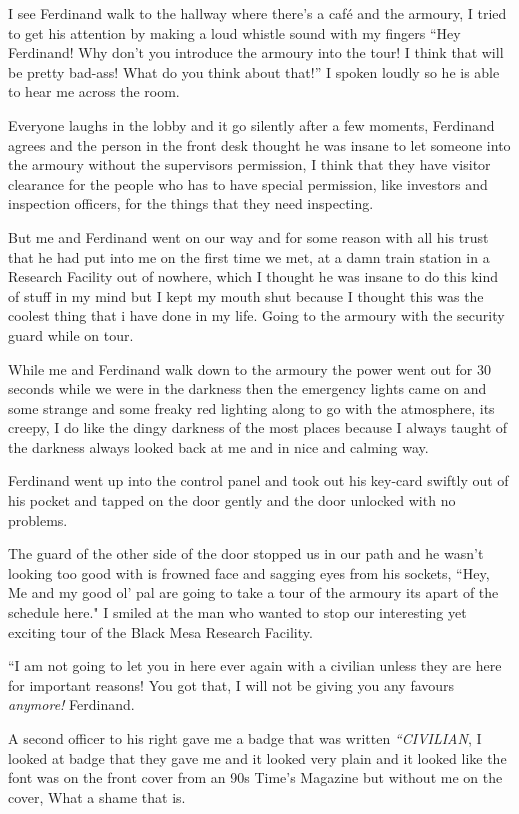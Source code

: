 \documentclass[14pt,letterpaper]{book}
\begin{document}
I see Ferdinand walk to the hallway where there's a café and the armoury, I tried to get his attention by making a loud whistle sound with my fingers ``Hey Ferdinand! Why don't you introduce the armoury into the tour! I think that will be pretty bad-ass! What do you think about that!'' I spoken loudly so he is able to hear me across the room.
 
Everyone laughs in the lobby and it go silently after a few moments, Ferdinand agrees and the person in the front desk thought he was insane to let someone into the armoury without the supervisors permission, I think that they have visitor clearance for the people who has to have special permission, like investors and inspection officers, for the things that they need inspecting.

But me and Ferdinand went on our way and for some reason with all his trust that he had put into me on the first time we met, at a damn train station in a Research Facility out of nowhere, which I thought he was insane to do this kind of stuff in my mind but I kept my mouth shut because I thought this was the coolest thing that i have done in my life. Going to the armoury with the security guard while on tour.

While me and Ferdinand walk down to the armoury the power went out for 30 seconds while we were in the darkness then the emergency lights came on and some strange and some freaky red lighting along to go with the atmosphere, its creepy, I do like the dingy darkness of the most places because I always taught of the darkness always looked back at me and in nice and calming way.

Ferdinand went up into the control panel and took out his key-card swiftly out of his pocket and tapped on the door gently and the door unlocked with no problems. 

The guard of the other side of the door stopped us in our path and he wasn't looking too good with is frowned face and sagging eyes from his sockets, ``Hey, Me and my good ol' pal are going to take a tour of the armoury its apart of the schedule here." I smiled at the man who wanted to stop our interesting yet exciting tour of the Black Mesa Research Facility.

``I am not going to let you in here ever again with a civilian unless they are here for important reasons! You got that, I will not be giving you any favours \textit{anymore!} Ferdinand.

A second officer to his right gave me a badge that was written \textit{``CIVILIAN}, I looked at badge that they gave me and it looked very plain and it looked like the font was on the front cover from an 90s Time's Magazine but without me on the cover, What a shame that is.
\end{document}
